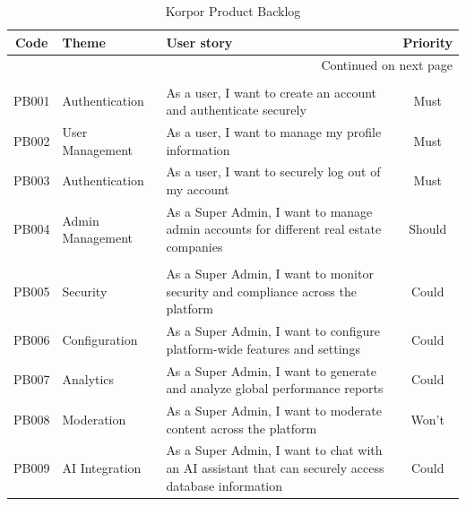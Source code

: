 \begin{longtable}{|c|l|p{8cm}|c|}
    \caption{Korpor Product Backlog\label{tab:product-backlog}} \\
    \hline
    \textbf{Code} & \textbf{Theme} & \textbf{User story} & \textbf{Priority} \\
    \hline
    \endfirsthead
    
    \hline
    \endhead
    
    \hline \multicolumn{4}{|r|}{{Continued on next page}} \\ \hline
    \endfoot
    
    \hline
    \endlastfoot
    
    \multicolumn{4}{|c|}{\cellcolor{primary!15}\textbf{\textcolor{primary}{Authentication \& User Management}}} \\
    \hline
    PB001 & Authentication & As a user, I want to create an account and authenticate securely & Must \\
    \hline
    PB002 & User Management & As a user, I want to manage my profile information & Must \\
    \hline
    PB003 & Authentication & As a user, I want to securely log out of my account & Must \\
    \hline
    PB004 & Admin Management & As a Super Admin, I want to manage admin accounts for different real estate companies & Should \\
    
    \newpage
    
    \multicolumn{4}{|c|}{\cellcolor{primary!15}\textbf{\textcolor{primary}{Super Admin Features}}} \\
    \hline
    PB005 & Security & As a Super Admin, I want to monitor security and compliance across the platform & Could \\
    \hline
    PB006 & Configuration & As a Super Admin, I want to configure platform-wide features and settings & Could \\
    \hline
    PB007 & Analytics & As a Super Admin, I want to generate and analyze global performance reports & Could \\
    \hline
    PB008 & Moderation & As a Super Admin, I want to moderate content across the platform & Won't \\
    \hline
    PB009 & AI Integration & As a Super Admin, I want to chat with an AI assistant that can securely access database information & Could \\
    \hline
    

\end{longtable}
